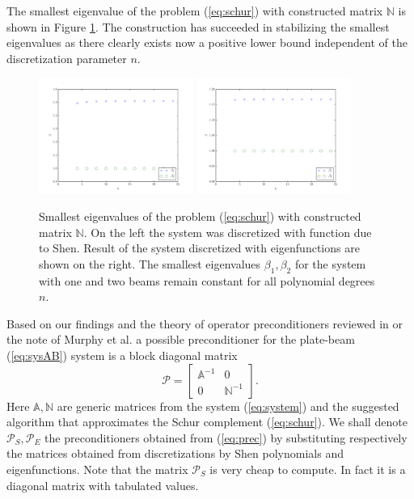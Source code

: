 \documentclass{marine_2015}
\begin{document}
The smallest eigenvalue of the problem (\ref{eq:schur}) with constructed matrix 
$\mathbb{N}$ is shown in Figure \ref{fig:schur}. The construction has
succeeded in stabilizing the smallest eigenvalues as there clearly exists now a 
positive lower bound independent of the discretization parameter $n$.
 \begin{figure}[h!]
 \centering
 \includegraphics[width=0.45\textwidth]{img/Schur_precond_shen_cond}
 \includegraphics[width=0.45\textwidth]{img/Schur_precond_sine_cond}\\
 \caption{Smallest eigenvalues of the problem (\ref{eq:schur}) with constructed
 matrix $\mathbb{N}$. On the left the system was discretized with function due
 to Shen. Result of the system discretized with eigenfunctions are shown on the
 right. The smallest eigenvalues $\beta_1, \beta_2$ for the system with one and
 two beams remain constant for all polynomial degrees $n$.}
 \label{fig:schur}
 \end{figure}

Based on our findings and the theory of operator preconditioners reviewed in
\cite{kent} or the note of Murphy et al. \cite{golub} a possible preconditioner 
for the plate-beam (\ref{eq:sysAB}) system is a block diagonal matrix
\begin{equation}
\label{eq:prec}
\mathcal{P} = 
    \begin{bmatrix}
      \mathbb{A}^{-1} & 0 \\
      0 & \mathbb{N}^{-1}
    \end{bmatrix}.
\end{equation}
Here $\mathbb{A}, \mathbb{N}$ are generic matrices from the system
(\ref{eq:system}) and the suggested algorithm that approximates the Schur
complement (\ref{eq:schur}). We shall denote $\mathcal{P}_S, \mathcal{P}_E$ the 
preconditioners obtained from (\ref{eq:prec}) by substituting respectively the 
matrices obtained from discretizations by Shen polynomials and eigenfunctions.
Note that the matrix $\mathcal{P}_S$ is very cheap to compute. In fact it 
is a diagonal matrix with tabulated values.
\end{document}
